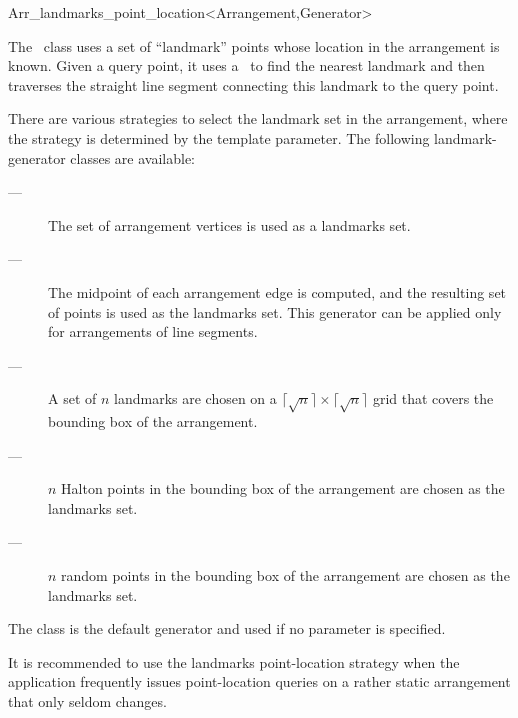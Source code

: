 
\ccRefPageBegin

\begin{ccRefClass}{Arr_landmarks_point_location<Arrangement,Generator>}
\label{arr_ref:lm_pl}

The \ccRefName\ class uses a set of ``landmark'' points whose location
in the arrangement is known. Given a query point, it uses a \kdtree\ to
find the nearest landmark and then traverses the straight line
segment connecting this landmark to the query point.

There are various strategies to select the landmark set in the
arrangement, where the strategy is determined by the
 template parameter. The following landmark-generator
classes are available:
\begin{description}
\item[ ---]
The set of arrangement vertices is used as a landmarks set.

\item[ ---]
The midpoint of each arrangement edge is computed, and the resulting
set of points is used as the landmarks set. This generator can be applied
only for arrangements of line segments.

\item[ ---]
A set of $n$ landmarks are chosen on a 
$\lceil \sqrt{n} \rceil \times \lceil \sqrt{n} \rceil$ 
grid that covers the bounding box of the arrangement.

\item[ ---]
$n$ Halton points in the bounding box of the arrangement are chosen
as the landmarks set.

\item[ ---]
$n$ random points in the bounding box of the arrangement are chosen
as the landmarks set.
\end{description}
The  class is the default generator
and used if no  parameter is specified.

It is recommended to use the landmarks point-location strategy
when the application frequently issues point-location queries on a
rather static arrangement that only seldom changes.


\ccIsModel
   \\

\end{ccRefClass}

\ccRefPageEnd
